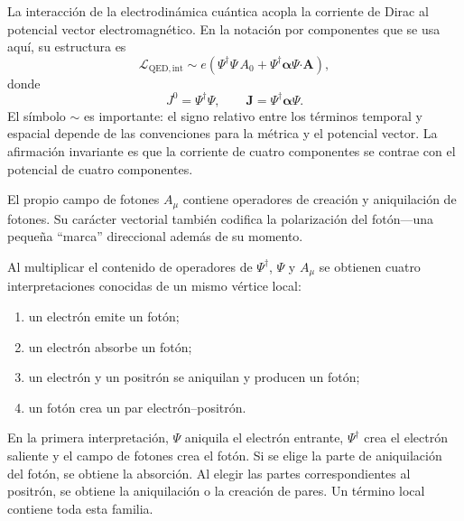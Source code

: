 La interacción de la electrodinámica cuántica acopla la corriente de Dirac al potencial vector electromagnético. En la notación por componentes que se usa aquí, su estructura es
\begin{equation}
\mathcal L_{\mathrm{QED,int}}
\sim
e\left(
\Psi^\dagger\Psi\,A_0
+
\Psi^\dagger\boldsymbol{\alpha}\Psi\mathbin{\boldsymbol{\cdot}}\mathbf A
\right),
\end{equation}
donde
\begin{equation}
J^0=\Psi^\dagger\Psi,
\qquad
\mathbf J=\Psi^\dagger\boldsymbol{\alpha}\Psi.
\end{equation}
El símbolo \(\sim\) es importante: el signo relativo entre los términos temporal y espacial depende de las convenciones para la métrica y el potencial vector. La afirmación invariante es que la corriente de cuatro componentes se contrae con el potencial de cuatro componentes.

El propio campo de fotones \(A_\mu\) contiene operadores de creación y aniquilación de fotones. Su carácter vectorial también codifica la polarización del fotón---una pequeña ``marca'' direccional además de su momento.

\begin{classroomqa}
\end{classroomqa}

Al multiplicar el contenido de operadores de \(\Psi^\dagger\), \(\Psi\) y \(A_\mu\) se obtienen cuatro interpretaciones conocidas de un mismo vértice local:
\begin{enumerate}
\item un electrón emite un fotón;
\item un electrón absorbe un fotón;
\item un electrón y un positrón se aniquilan y producen un fotón;
\item un fotón crea un par electrón--positrón.
\end{enumerate}
En la primera interpretación, \(\Psi\) aniquila el electrón entrante, \(\Psi^\dagger\) crea el electrón saliente y el campo de fotones crea el fotón. Si se elige la parte de aniquilación del fotón, se obtiene la absorción. Al elegir las partes correspondientes al positrón, se obtiene la aniquilación o la creación de pares. Un término local contiene toda esta familia.

